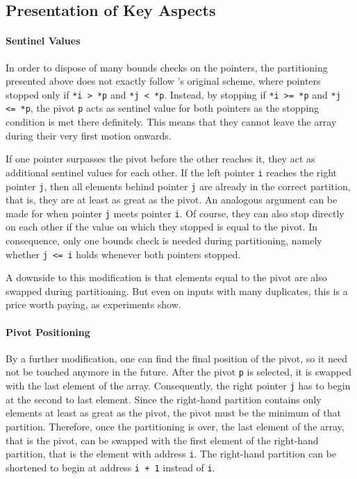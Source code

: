 \subsection{Presentation of Key Aspects}
\label{sec:tasklet:quick:aspects}

\paragraph{Sentinel Values}
\label{sec:tasklet:quick:imp:sentinels}
In order to dispose of many bounds checks on the pointers, the partitioning presented above does not exactly follow \citeauthor{hoare1962quicksort}'s original scheme, where pointers stopped only if \lstinline|*i > *p| and \lstinline|*j < *p|.
Instead, by stopping if \lstinline|*i >= *p| and \lstinline|*j <= *p|, the pivot \lstinline|p| acts as sentinel value for both pointers as the stopping condition is met there definitely.
This means that they cannot leave the array during their very first motion onwards.

If one pointer surpasses the pivot before the other reaches it, they act as additional sentinel values for each other.
If the left pointer \lstinline|i| reaches the right pointer \lstinline|j|, then all elements behind pointer \lstinline|j| are already in the correct partition, that is, they are at least as great as the pivot.
An analogous argument can be made for when pointer \lstinline|j| meets pointer \lstinline|i|.
Of course, they can also stop directly on each other if the value on which they stopped is equal to the pivot.
In consequence, only one bounds check is needed during partitioning, namely whether \lstinline|j <= i| holds whenever both pointers stopped.

A downside to this modification is that elements equal to the pivot are also swapped during partitioning.
But even on inputs with many duplicates, this is a price worth paying, as experiments show.


\paragraph{Pivot Positioning}
By a further modification, one can find the final position of the pivot, so it need not be touched anymore in the future.
After the pivot \lstinline|p| is selected, it is swapped with the last element of the array.
Consequently, the right pointer \lstinline|j| has to begin at the second to last element.
Since the right-hand partition contains only elements at least as great as the pivot, the pivot must be the minimum of that partition.
Therefore, once the partitioning is over, the last element of the array, that is the pivot, can be swapped with the first element of the right-hand partition, that is the element with address \lstinline|i|.
The right-hand partition can be shortened to begin at address \lstinline|i + 1| instead of \lstinline|i|.


